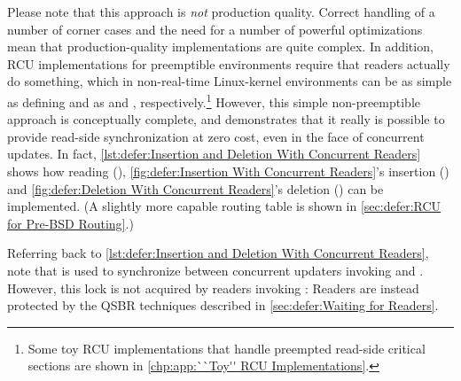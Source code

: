 Please note that this approach is \emph{not} production quality.
Correct handling of a number of corner cases and the need for a number
of powerful optimizations mean that production-quality implementations
are quite complex.
In addition, RCU implementations for preemptible environments
require that readers actually do something, which in non-real-time
Linux-kernel environments can be as simple as defining
 and  as 
and , respectively.\footnote{
	Some toy RCU implementations that handle preempted
	read-side critical sections are shown in
	\cref{chp:app:``Toy'' RCU Implementations}\@.}
However, this simple non-preemptible approach is conceptually complete,
and demonstrates that it really is possible to provide read-side
synchronization at zero cost, even in the face of concurrent updates.
In fact,
\cref{lst:defer:Insertion and Deletion With Concurrent Readers}
shows how reading (),
\cref{fig:defer:Insertion With Concurrent Readers}'s
insertion () and
\cref{fig:defer:Deletion With Concurrent Readers}'s
deletion () can
be implemented.
(A slightly more capable routing table is shown in
\cref{sec:defer:RCU for Pre-BSD Routing}.)


Referring back to
\cref{lst:defer:Insertion and Deletion With Concurrent Readers},
note that  is used to synchronize between concurrent updaters
invoking  and .
However, this lock is not acquired by readers invoking :
Readers are instead protected by the QSBR techniques described in
\cref{sec:defer:Waiting for Readers}.

